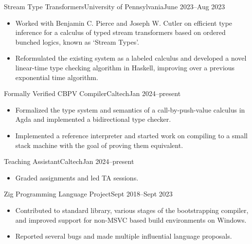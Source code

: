 \documentclass[a4paper]{article}
\begin{document}
    \begin{activity*}{Stream Type Transformers}{University of Pennsylvania}{June 2023--Aug 2023}
      \begin{itemize}[topsep=5pt, partopsep=0pt, itemsep=-1pt]
        \item Worked with Benjamin C. Pierce and Joseph W. Cutler on efficient type inference for a calculus of typed stream transformers based on ordered bunched logics, known as `Stream Types'.
        \item Reformulated the existing system as a labeled calculus and developed a novel linear-time type checking algorithm in Haskell, improving over a previous exponential time algorithm.
      \end{itemize}
    \end{activity*}

    \begin{activity*}{Formally Verified CBPV Compiler}{Caltech}{Jan 2024--present}
      \begin{itemize}[topsep=5pt, partopsep=0pt, itemsep=-1pt]
        \item Formalized the type system and semantics of a call-by-push-value calculus in Agda and implemented a bidirectional type checker.
        \item Implemented a reference interpreter and started work on compiling to a small stack machine with the goal of proving them equivalent.
      \end{itemize}
    \end{activity*}

    \begin{activity*}{Teaching Assistant}{Caltech}{Jan 2024--present}
      \begin{itemize}[topsep=5pt, partopsep=0pt, itemsep=-1pt]
        \item Graded assignments and led TA sessions.
      \end{itemize}
    \end{activity*}

    \begin{activity}{Zig Programming Language Project}{Sept 2018--Sept 2023}
      \begin{itemize}[topsep=5pt, partopsep=0pt, itemsep=-1pt]
        \item Contributed to standard library, various stages of the bootstrapping compiler, and improved support for non-MSVC based build environments on Windows.
        \item Reported several bugs and made multiple influential language proposals.
      \end{itemize}
    \end{activity}
\end{document}
